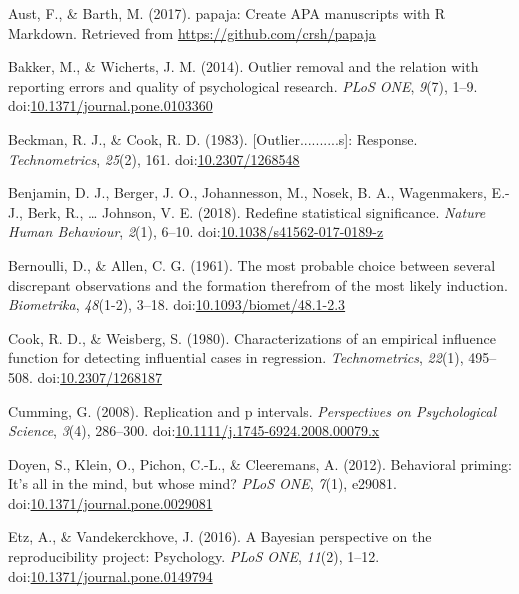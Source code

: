 \documentclass[english,,man]{apa6}
\begin{document}
\leavevmode\hypertarget{ref-Aust2017}{}%
Aust, F., \& Barth, M. (2017). papaja: Create APA manuscripts with R Markdown. Retrieved from \url{https://github.com/crsh/papaja}

\leavevmode\hypertarget{ref-Bakker2014}{}%
Bakker, M., \& Wicherts, J. M. (2014). Outlier removal and the relation with reporting errors and quality of psychological research. \emph{PLoS ONE}, \emph{9}(7), 1--9. doi:\href{https://doi.org/10.1371/journal.pone.0103360}{10.1371/journal.pone.0103360}

\leavevmode\hypertarget{ref-Beckman1983}{}%
Beckman, R. J., \& Cook, R. D. (1983). {[}Outlier..........s{]}: Response. \emph{Technometrics}, \emph{25}(2), 161. doi:\href{https://doi.org/10.2307/1268548}{10.2307/1268548}

\leavevmode\hypertarget{ref-Benjamin2018}{}%
Benjamin, D. J., Berger, J. O., Johannesson, M., Nosek, B. A., Wagenmakers, E.-J., Berk, R., \ldots{} Johnson, V. E. (2018). Redefine statistical significance. \emph{Nature Human Behaviour}, \emph{2}(1), 6--10. doi:\href{https://doi.org/10.1038/s41562-017-0189-z}{10.1038/s41562-017-0189-z}

\leavevmode\hypertarget{ref-Bernoulli1777}{}%
Bernoulli, D., \& Allen, C. G. (1961). The most probable choice between several discrepant observations and the formation therefrom of the most likely induction. \emph{Biometrika}, \emph{48}(1-2), 3--18. doi:\href{https://doi.org/10.1093/biomet/48.1-2.3}{10.1093/biomet/48.1-2.3}

\leavevmode\hypertarget{ref-Cook1980}{}%
Cook, R. D., \& Weisberg, S. (1980). Characterizations of an empirical influence function for detecting influential cases in regression. \emph{Technometrics}, \emph{22}(1), 495--508. doi:\href{https://doi.org/10.2307/1268187}{10.2307/1268187}

\leavevmode\hypertarget{ref-Cumming2008}{}%
Cumming, G. (2008). Replication and p intervals. \emph{Perspectives on Psychological Science}, \emph{3}(4), 286--300. doi:\href{https://doi.org/10.1111/j.1745-6924.2008.00079.x}{10.1111/j.1745-6924.2008.00079.x}

\leavevmode\hypertarget{ref-Doyen2012}{}%
Doyen, S., Klein, O., Pichon, C.-L., \& Cleeremans, A. (2012). Behavioral priming: It's all in the mind, but whose mind? \emph{PLoS ONE}, \emph{7}(1), e29081. doi:\href{https://doi.org/10.1371/journal.pone.0029081}{10.1371/journal.pone.0029081}

\leavevmode\hypertarget{ref-Etz2016}{}%
Etz, A., \& Vandekerckhove, J. (2016). A Bayesian perspective on the reproducibility project: Psychology. \emph{PLoS ONE}, \emph{11}(2), 1--12. doi:\href{https://doi.org/10.1371/journal.pone.0149794}{10.1371/journal.pone.0149794}
\end{document}

